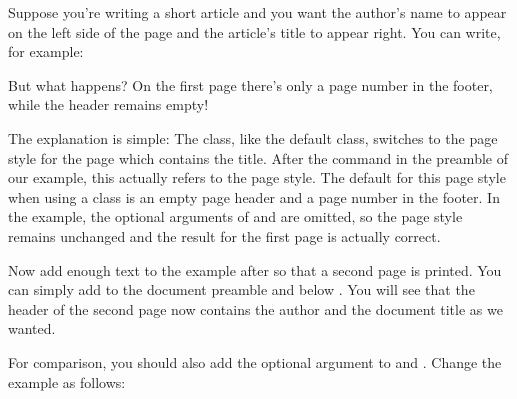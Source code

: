 %
\begin{Example}
  Suppose you're writing a short article and you want the author's name to
  appear on the left side of the page and the article's title to appear
  right. You can write, for example:
  But what happens? On the first page there's only a page number in the
  footer, while the header remains empty!

  The explanation is simple: The  class, like the default
   class, switches to the  page style for the
  page which contains the title. After the command
   in the preamble of
  our example, this actually refers to the
   page style. The default for
  this page style when using a \KOMAScript{} class is an empty page header and
  a page number in the footer. In the example, the optional arguments of
   and  are omitted, so the
   page style remains
  unchanged and the result for the first page is actually correct.

  Now add enough text to the example after  
  so that a second page is printed. You can simply add
   to the document
  preamble and  below
  . You will see that the header of the second
  page now contains the author and the document title as we wanted.

  For comparison, you should also add the optional argument to
   and . Change the example as follows:
\end{Example}
